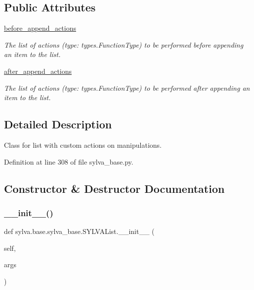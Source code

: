 \subsection*{Public Attributes}
\begin{DoxyCompactItemize}
\item 
\hyperlink{classsylva_1_1base_1_1sylva__base_1_1_s_y_l_v_a_list_a5ecf6ed5a0fbfa81d3c657a18a71a934}{before\+\_\+append\+\_\+actions}
\begin{DoxyCompactList}\small\item\em The list of actions (type\+: types.\+Function\+Type) to be performed before appending an item to the list. \end{DoxyCompactList}\item 
\hyperlink{classsylva_1_1base_1_1sylva__base_1_1_s_y_l_v_a_list_ab32bfb41a69f89b6d7c7f30c397749b0}{after\+\_\+append\+\_\+actions}
\begin{DoxyCompactList}\small\item\em The list of actions (type\+: types.\+Function\+Type) to be performed after appending an item to the list. \end{DoxyCompactList}\end{DoxyCompactItemize}


\subsection{Detailed Description}
Class for list with custom actions on manipulations. 

Definition at line 308 of file sylva\+\_\+base.\+py.



\subsection{Constructor \& Destructor Documentation}
\mbox{\label{classsylva_1_1base_1_1sylva__base_1_1_s_y_l_v_a_list_a43f7e190df1f424bcbf14b9c892b2127}} 
\subsubsection{\texorpdfstring{\+\_\+\+\_\+init\+\_\+\+\_\+()}{\_\_init\_\_()}}
{\footnotesize\ttfamily def sylva.\+base.\+sylva\+\_\+base.\+S\+Y\+L\+V\+A\+List.\+\_\+\+\_\+init\+\_\+\+\_\+ (\begin{DoxyParamCaption}\item[{}]{self,  }\item[{}]{args }\end{DoxyParamCaption})}



